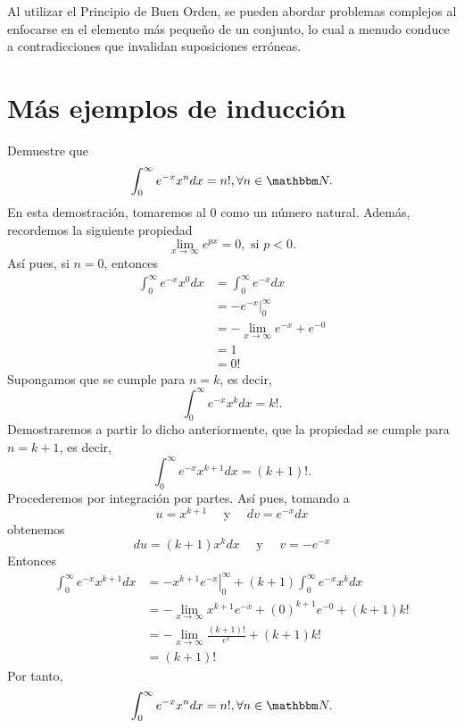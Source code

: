 Al utilizar el Principio de Buen Orden, se pueden abordar problemas complejos al enfocarse en el elemento más pequeño de un conjunto, lo cual a menudo conduce a contradicciones que invalidan suposiciones erróneas. 

\section{Más ejemplos de inducción}

\begin{example}
    Demuestre que
    $$\int_{0}^{\infty} e^{-x}x^{n} dx=n!, \forall n \in \NN.$$
    \demostracion En esta demostración, tomaremos al $0$ como un número natural. Además, recordemos la siguiente propiedad
    $$\lim_{x \to \infty} e^{px}=0, \text{ si } p<0.$$
    Así pues, si $n=0$, entonces
    \begin{align*}
        \int_{0}^{\infty} e^{-x}x^0 dx &= \int_{0}^{\infty} e^{-x} dx \\
        &=\left. -e^{-x} \right|_{0}^{\infty} \\
        &=- \lim_{x \rightarrow \infty} e^{-x} + e^{-0} \\
        &=1 \\
        &=0!
    \end{align*}
    Supongamos que se cumple para $n=k$, es decir,
    $$\int_{0}^{\infty} e^{-x}x^{k} dx=k!.$$
    Demostraremos a partir lo dicho anteriormente, que la propiedad se cumple para $n=k+1$, es decir,
    $$\int_{0}^{\infty} e^{-x}x^{k+1} dx=(k+1)!.$$
    Procederemos por integración por partes. Así pues, tomando a
    $$u=x^{k+1} \quad \text{ y } \quad dv=e^{-x} dx$$
    obtenemos
    $$du=(k+1)x^k dx \quad \text{ y } \quad v=-e^{-x}$$
    Entonces
    \begin{align*}
        \int_{0}^{\infty} e^{-x}x^{k+1} dx &= \left. -x^{k+1}e^{-x} \right|_{0}^{\infty} + (k+1) \int_{0}^{\infty} e^{-x} x^k dx \\
        &=- \lim_{x \rightarrow \infty} x^{k+1}e^{-x}+(0)^{k+1}e^{-0}+(k+1)k! \\
        &=- \lim_{x \rightarrow \infty} \frac{(k+1)!}{e^x} +(k+1)k! \\
        &=(k+1)!
    \end{align*}
    Por tanto,
    $$\int_{0}^{\infty} e^{-x}x^{n} dx=n!, \forall n \in \NN.$$
\end{example}

